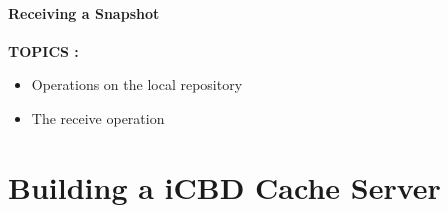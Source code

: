 \paragraph{Receiving a Snapshot}
\label{par:receive_snap}

\textbf{TOPICS :}
\begin{itemize}
	\item Operations on the local repository
	\item The receive operation
\end{itemize}




\section{Building a iCBD Cache Server}
\label{sec:impl_cache_server}



